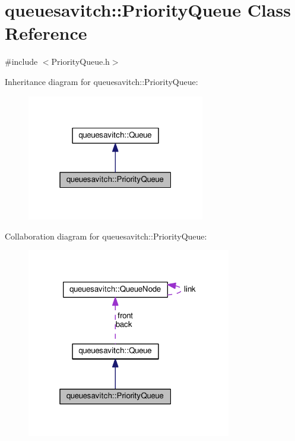 \hypertarget{classqueuesavitch_1_1PriorityQueue}{}\section{queuesavitch\+:\+:Priority\+Queue Class Reference}
\label{classqueuesavitch_1_1PriorityQueue}


{\ttfamily \#include $<$Priority\+Queue.\+h$>$}



Inheritance diagram for queuesavitch\+:\+:Priority\+Queue\+:
\nopagebreak
\begin{figure}[H]
\begin{center}
\leavevmode
\includegraphics[width=220pt]{classqueuesavitch_1_1PriorityQueue__inherit__graph}
\end{center}
\end{figure}


Collaboration diagram for queuesavitch\+:\+:Priority\+Queue\+:
\nopagebreak
\begin{figure}[H]
\begin{center}
\leavevmode
\includegraphics[width=253pt]{classqueuesavitch_1_1PriorityQueue__coll__graph}
\end{center}
\end{figure}
